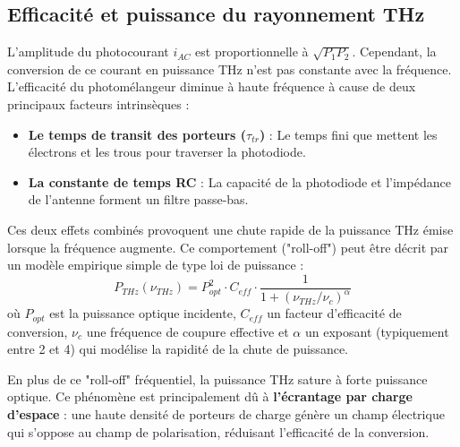 \subsection{Efficacité et puissance du rayonnement THz}

L'amplitude du photocourant $i_{AC}$ est proportionnelle à $\sqrt{P_1 P_2}$. Cependant, la conversion de ce courant en puissance THz n'est pas constante avec la fréquence. L'efficacité du photomélangeur diminue à haute fréquence à cause de deux principaux facteurs intrinsèques :
\begin{itemize}
    \item \textbf{Le temps de transit des porteurs ($\tau_{tr}$)} : Le temps fini que mettent les électrons et les trous pour traverser la photodiode.
    \item \textbf{La constante de temps RC} : La capacité de la photodiode et l'impédance de l'antenne forment un filtre passe-bas.
\end{itemize}
Ces deux effets combinés provoquent une chute rapide de la puissance THz émise lorsque la fréquence augmente. Ce comportement ("roll-off") peut être décrit par un modèle empirique simple de type loi de puissance :
\begin{equation}
P_{THz}(\nu_{THz}) = P_{opt}^2 \cdot C_{eff} \cdot \frac{1}{1 + (\nu_{THz}/\nu_{c})^\alpha}
\label{eq:power_roll_off}
\end{equation}
où $P_{opt}$ est la puissance optique incidente, $C_{eff}$ un facteur d'efficacité de conversion, $\nu_{c}$ une fréquence de coupure effective et $\alpha$ un exposant (typiquement entre 2 et 4) qui modélise la rapidité de la chute de puissance.

En plus de ce "roll-off" fréquentiel, la puissance THz sature à forte puissance optique. Ce phénomène est principalement dû à \textbf{l'écrantage par charge d'espace} : une haute densité de porteurs de charge génère un champ électrique qui s'oppose au champ de polarisation, réduisant l'efficacité de la conversion.



